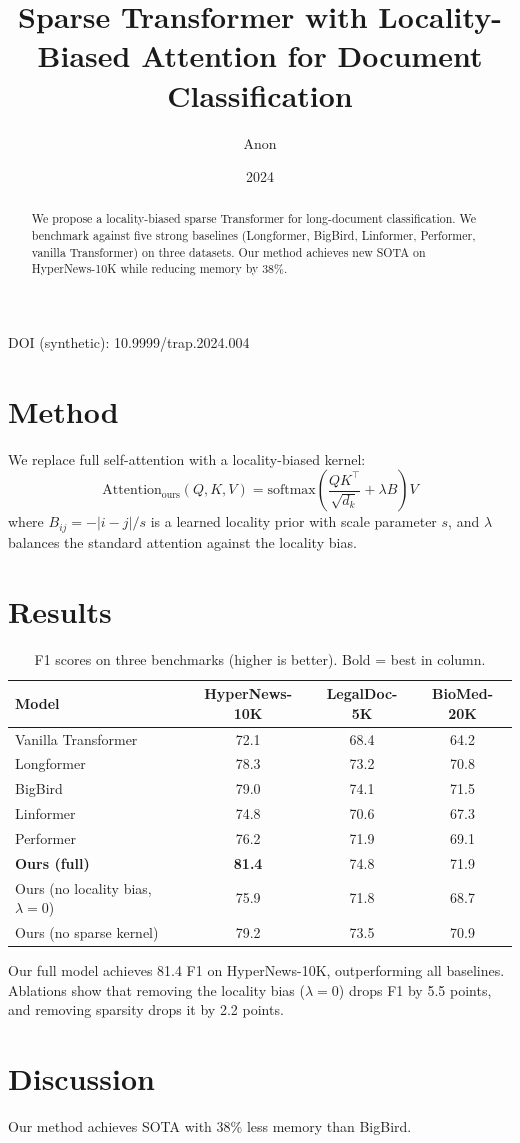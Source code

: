\documentclass[11pt]{article}
\title{Sparse Transformer with Locality-Biased Attention for Document Classification}
\author{Anon}
\date{2024}
\begin{document}
\maketitle
\noindent DOI (synthetic): 10.9999/trap.2024.004

\begin{abstract}
We propose a locality-biased sparse Transformer for long-document classification. We benchmark against five strong baselines (Longformer, BigBird, Linformer, Performer, vanilla Transformer) on three datasets. Our method achieves new SOTA on HyperNews-10K while reducing memory by 38\%.
\end{abstract}

\section{Method}
We replace full self-attention with a locality-biased kernel:
\begin{equation}
\text{Attention}_{\text{ours}}(Q, K, V) = \text{softmax}\!\left(\frac{Q K^\top}{\sqrt{d_k}} + \lambda B\right) V
\end{equation}
where $B_{ij} = -|i-j|/s$ is a learned locality prior with scale parameter $s$, and $\lambda$ balances the standard attention against the locality bias.

\section{Results}

\begin{table}[h]
\centering
\caption{F1 scores on three benchmarks (higher is better). Bold = best in column.}
\begin{tabular}{lccc}
\toprule
Model & HyperNews-10K & LegalDoc-5K & BioMed-20K \\
\midrule
Vanilla Transformer & 72.1 & 68.4 & 64.2 \\
Longformer & 78.3 & 73.2 & 70.8 \\
BigBird & 79.0 & 74.1 & 71.5 \\
Linformer & 74.8 & 70.6 & 67.3 \\
Performer & 76.2 & 71.9 & 69.1 \\
\midrule
\textbf{Ours (full)} & \textbf{81.4} & 74.8 & 71.9 \\
Ours (no locality bias, $\lambda = 0$) & 75.9 & 71.8 & 68.7 \\
Ours (no sparse kernel) & 79.2 & 73.5 & 70.9 \\
\bottomrule
\end{tabular}
\end{table}

Our full model achieves 81.4 F1 on HyperNews-10K, outperforming all baselines. Ablations show that removing the locality bias ($\lambda=0$) drops F1 by 5.5 points, and removing sparsity drops it by 2.2 points.

\section{Discussion}
Our method achieves SOTA with 38\% less memory than BigBird.
\end{document}
